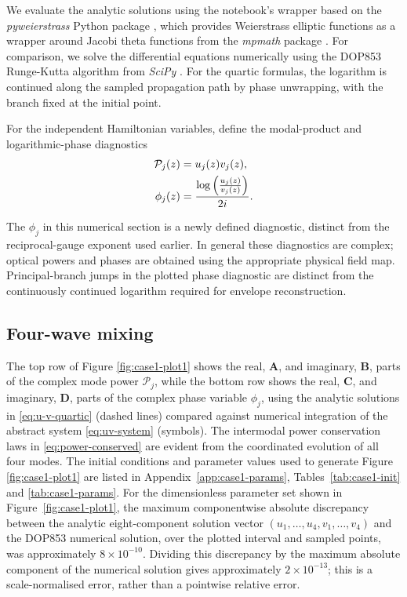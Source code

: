 \documentclass[11pt,a4paper]{article}
\numberwithin{equation}{section}
\begin{document}
We evaluate the analytic solutions using the notebook's wrapper based on the \emph{pyweierstrass} Python package \cite{laurentPyweierstrass2022}, which provides Weierstrass elliptic functions as a wrapper around Jacobi theta functions from the \emph{mpmath} package \cite{MpmathPythonLibrary2023}.
For comparison, we solve the differential equations numerically using the DOP853 Runge-Kutta algorithm from \emph{SciPy} \cite{virtanenSciPy10Fundamental2020}.
For the quartic formulas, the logarithm is continued along the sampled propagation path by phase unwrapping, with the branch fixed at the initial point.

For the independent Hamiltonian variables, define the modal-product and logarithmic-phase diagnostics
\begin{align}
\mathcal{P}_j(z) &= u_j(z)v_j(z), \notag \\
\phi_j(z) &= \frac{\log\left(\frac{u_j(z)}{v_j(z)}\right)}{2 i}. \label{eq:A-phi-u-v}
\end{align}

The $\phi_j$ in this numerical section is a newly defined diagnostic, distinct from the reciprocal-gauge exponent used earlier.
In general these diagnostics are complex; optical powers and phases are obtained using the appropriate physical field map.
Principal-branch jumps in the plotted phase diagnostic are distinct from the continuously continued logarithm required for envelope reconstruction.

\subsection{Four-wave mixing}
The top row of Figure \ref{fig:case1-plot1} shows the real, \textbf{A}, and imaginary, \textbf{B}, parts of the complex mode power $\mathcal{P}_j$,
while the bottom row shows the real, \textbf{C}, and imaginary, \textbf{D}, parts of the complex phase variable $\phi_j$, using the analytic solutions in \eqref{eq:u-v-quartic} (dashed lines) compared against numerical integration of the abstract system \eqref{eq:uv-system} (symbols).
The intermodal power conservation laws in \eqref{eq:power-conserved} are evident from the coordinated evolution of all four modes.
The initial conditions and parameter values used to generate Figure \ref{fig:case1-plot1} are listed in Appendix~\ref{app:case1-params}, Tables~\ref{tab:case1-init} and \ref{tab:case1-params}.
For the dimensionless parameter set shown in Figure~\ref{fig:case1-plot1}, the maximum componentwise absolute discrepancy between the analytic eight-component solution vector $(u_1,\ldots,u_4,v_1,\ldots,v_4)$ and the DOP853 numerical solution, over the plotted interval and sampled points, was approximately $8\times10^{-10}$.
Dividing this discrepancy by the maximum absolute component of the numerical solution gives approximately $2\times10^{-13}$; this is a scale-normalised error, rather than a pointwise relative error.
\end{document}
